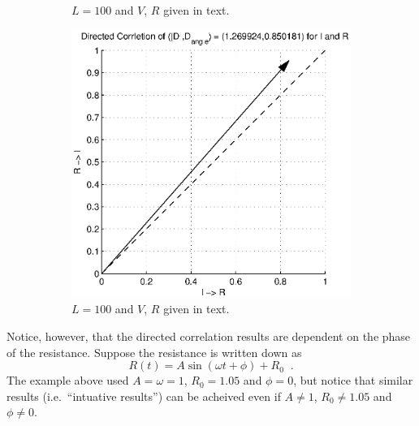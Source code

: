 \documentclass[a4paper,11pt]{article}
\begin{document}
\begin{figure}[h!t]
\begin{subfigure}[b]{0.25\textwidth}
\caption{$L = 100$ and $V$, $R$ given in text.}
\end{subfigure}
\begin{subfigure}[b]{0.25\textwidth}
\label{fig:RL_RvarySig2CCMIR}
\includegraphics[scale=0.4]{graphics/RL_RvarySig2CCMIR.eps}
\caption{$L = 100$ and $V$, $R$ given in text.}
\end{subfigure}
\caption{}
\end{figure}
Notice, however, that the directed correlation results are dependent on the phase of the resistance.  Suppose the resistance is written down as
$$
R(t) = A\sin(\omega t + \phi) + R_0\;\;.
$$
The example above used $A=\omega=1$, $R_0=1.05$ and $\phi=0$, but notice that similar results (i.e.\ ``intuative results'') can be acheived even if $A\neq 1$, $R_0\neq 1.05$ and $\phi\neq 0$.  
\end{document}
